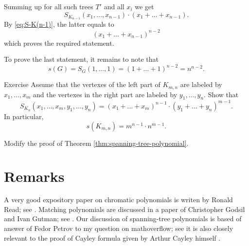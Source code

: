 Summing up for all such trees $T'$ and all $x_i$ we get 
\[S_{K_{n-1}}(x_1,\dots,x_{n-1})\cdot(x_1+\dots+x_{n-1}).\]
By \ref{eq:S-K(n-1)}, the latter equals to
\[(x_1+\dots+x_{n-1})^{n-2}\]
which proves the required statement.

To prove the last statement, it remains to note that 
\[s(G)=S_G(1,\dots,1)=(1+\dots+1)^{n-2}=n^{n-2}.\]
\qedsf

\begin{thm}{Exercise}
Assume that the vertexes of the left part of $K_{m,n}$ are labeled by $x_1,\dots,x_m$ and the vertexes in the right part are labeled by $y_1,\dots,y_n$. 
Show that
\[S_{K_n}(x_1,\dots,x_m,y_1,\dots,y_n)=(x_1+\dots +x_m)^{n-1}\cdot(y_1+\dots +y_n)^{m-1}.\]
In particular, 
\[s(K_{m,n})=m^{n-1}\cdot n^{m-1}.\]

\end{thm}

 Modify the proof of Theorem \ref{thm:spanning-tree-polynomial}.

\section*{Remarks}

A very good expository paper on chromatic polynomials is writen by
Ronald Read; see \cite{read}. 
Matching polynomials are discussed in a paper of Christopher Godsil and Ivan Gutman; see \cite{godsil-gutman}.
Our discussion of spanning-tree polynomials is based of answer of Fedor Petrov \cite{petrov} to my question on mathoverflow; see  it is also closely relevant to the proof of Cayley formula given by Arthur Cayley himself \cite{cayley}. 